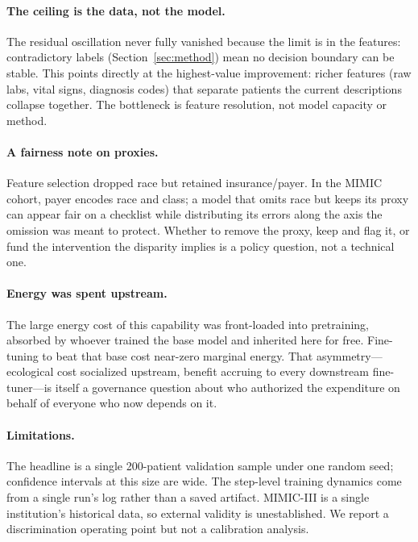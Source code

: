 \documentclass[sigconf,nonacm]{acmart}
\begin{document}
\paragraph{The ceiling is the data, not the model.}
The residual oscillation never fully vanished because the limit is in the
features: contradictory labels (Section~\ref{sec:method}) mean no decision
boundary can be stable. This points directly at the highest-value improvement:
richer features (raw labs, vital signs, diagnosis codes) that separate patients
the current descriptions collapse together. The bottleneck is feature
resolution, not model capacity or method.

\paragraph{A fairness note on proxies.}
Feature selection dropped race but retained insurance/payer. In the MIMIC
cohort, payer encodes race and class; a model that omits race but keeps its
proxy can appear fair on a checklist while distributing its errors along the
axis the omission was meant to protect. Whether to remove the proxy, keep and
flag it, or fund the intervention the disparity implies is a policy question,
not a technical one.

\paragraph{Energy was spent upstream.}
The large energy cost of this capability was front-loaded into pretraining,
absorbed by whoever trained the base model and inherited here for free.
Fine-tuning to beat that base cost near-zero marginal energy. That
asymmetry---ecological cost socialized upstream, benefit accruing to every
downstream fine-tuner---is itself a governance question about who authorized the
expenditure on behalf of everyone who now depends on it.

\paragraph{Limitations.}
The headline is a single 200-patient validation sample under one random seed;
confidence intervals at this size are wide. The step-level training dynamics
come from a single run's log rather than a saved artifact. MIMIC-III is a single
institution's historical data, so external validity is unestablished. We report
a discrimination operating point but not a calibration analysis.

\end{document}
